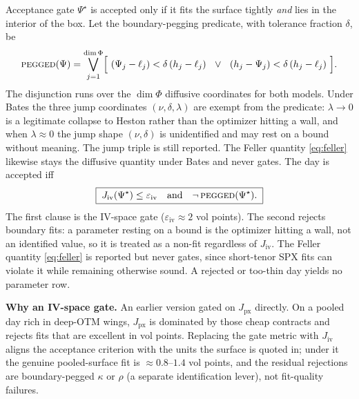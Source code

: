 \documentclass[a4paper, 11pt, reqno]{amsart}
\makeatletter
\def\section{\@startsection{section}{1}%
  \z@{.7\linespacing\@plus\linespacing}{.5\linespacing}%
  {\normalfont\bfseries\centering}}
\makeatother
\begin{document}
	\section{Acceptance gate}\label{sec:gate}
		$\Psi^\star$ is accepted only if it fits the surface tightly \emph{and} lies in the interior
		of the box. Let the boundary-pegging predicate, with tolerance fraction $\delta$, be
		\begin{equation}\label{eq:pegged}
			\textsc{pegged}(\Psi)
			= \bigvee_{j=1}^{\dim\Phi}
			\Bigl[\ (\Psi_j - \ell_j) < \delta\,(h_j-\ell_j)
			\ \ \vee\ \
			(h_j - \Psi_j) < \delta\,(h_j-\ell_j) \ \Bigr].
		\end{equation}
		The disjunction runs over the $\dim\Phi$ diffusive coordinates for both models. Under Bates the three jump
		coordinates $(\nu,\delta,\lambda)$ are exempt from the predicate: $\lambda\to0$ is a legitimate
		collapse to Heston rather than the optimizer hitting a wall, and when $\lambda\approx0$ the jump
		shape $(\nu,\delta)$ is unidentified and may rest on a bound without meaning. The jump triple is
		still reported. The Feller quantity \eqref{eq:feller} likewise stays the diffusive quantity under
		Bates and never gates.
		The day is accepted iff
		\begin{equation}\label{eq:accept}
			\boxed{\;
			J_{\mathrm{iv}}(\Psi^\star) \le \varepsilon_{\mathrm{iv}}
			\quad\text{and}\quad
			\lnot\,\textsc{pegged}(\Psi^\star).
			\;}
		\end{equation}
		The first clause is the IV-space gate ($\varepsilon_{\mathrm{iv}}\approx 2$ vol points). The
		second rejects boundary fits: a parameter resting on a bound is the optimizer hitting a wall,
		not an identified value, so it is treated as a non-fit regardless of $J_{\mathrm{iv}}$. The
		Feller quantity \eqref{eq:feller} is reported but never gates, since short-tenor SPX fits can
		violate it while remaining otherwise sound. A rejected or too-thin day yields no parameter
		row.
	
		\textbf{Why an IV-space gate.} An earlier version gated on $J_{\mathrm{px}}$ directly. On a
		pooled day rich in deep-OTM wings, $J_{\mathrm{px}}$ is dominated by those cheap contracts and
		rejects fits that are excellent in vol points. Replacing the gate metric with
		$J_{\mathrm{iv}}$ aligns the acceptance criterion with the units the surface is quoted in;
		under it the genuine pooled-surface fit is $\approx 0.8$--$1.4$ vol points, and the residual
		rejections are boundary-pegged $\kappa$ or $\rho$ (a separate identification lever), not
		fit-quality failures.
\end{document}
